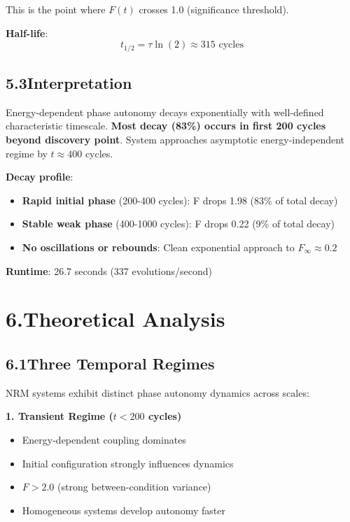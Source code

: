 \documentclass[11pt]{article}
\begin{document}
This is the point where $F(t)$ crosses 1.0 (significance threshold).

\noindent\textbf{Half-life}:
\begin{equation}
t_{1/2} = \tau \ln(2) \approx 315 \text{ cycles}
\end{equation}

\subsection*{5.3\quad Interpretation}

Energy-dependent phase autonomy decays exponentially with well-defined characteristic timescale. \textbf{Most decay (83\%) occurs in first 200 cycles beyond discovery point}. System approaches asymptotic energy-independent regime by $t \approx 400$ cycles.

\noindent\textbf{Decay profile}:
\begin{itemize}
    \item \textbf{Rapid initial phase} (200-400 cycles): F drops 1.98 (83\% of total decay)
    \item \textbf{Stable weak phase} (400-1000 cycles): F drops 0.22 (9\% of total decay)
    \item \textbf{No oscillations or rebounds}: Clean exponential approach to $F_\infty \approx 0.2$
\end{itemize}

\noindent\textbf{Runtime}: 26.7 seconds (337 evolutions/second)

\section*{6.\quad Theoretical Analysis}

\subsection*{6.1\quad Three Temporal Regimes}

NRM systems exhibit distinct phase autonomy dynamics across scales:

\noindent\textbf{1. Transient Regime ($t < 200$ cycles)}
\begin{itemize}
    \item Energy-dependent coupling dominates
    \item Initial configuration strongly influences dynamics
    \item $F > 2.0$ (strong between-condition variance)
    \item Homogeneous systems develop autonomy faster
\end{itemize}
\end{document}
